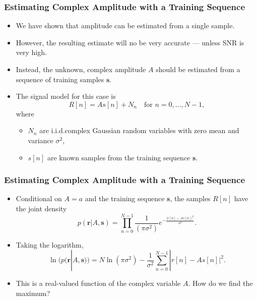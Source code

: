 \begin{frame}
  \frametitle{Estimating Complex Amplitude with a Training Sequence}
  \begin{itemize}
  \item We have shown that amplitude can be estimated from a single
    sample.
  \item However, the resulting estimate will no be very accurate ---
    unless SNR is very high.
  \item Instead, the unknown, complex amplitude $A$ should be estimated from a sequence
    of training samples $\bm{s}$.
  \item The signal model for this case is
    \[
      R[n] = A s[n] + N_n \quad \text{for $n=0, \ldots, N-1$},
    \]
    where
    \begin{itemize}
    \item $N_n$ are i.i.d.\@  complex Gaussian random variables with
      zero mean and variance $\sigma^2$,
    \item $s[n]$ are known samples from the training sequence $\bm{s}$.
    \end{itemize}
  \end{itemize}
\end{frame}

\begin{frame}
  \frametitle{Estimating Complex Amplitude with a Training Sequence}
  \begin{itemize}
  \item Conditional on $A=a$ and the training sequence $\bm{s}$, the
    samples $R[n]$ have the joint density
    \[
      p(\bm{r} |A, \bm{s}) = \prod_{n=0}^{N-1} \frac{1}{(\pi
        \sigma^2)} e^{-\frac{|r[n] - As[n]|^2}{\sigma^2}}.
    \]
  \item Taking the logarithm,
    \[
      \ln( p(\bm{r} |A, \bm{s})) = N \ln(\pi \sigma^2) -
      \frac{1}{\sigma^2} \sum_{n=0}^{N-1} |r[n] - As[n]|^2.
    \]
  \item This is a real-valued function of the complex variable
    $A$. How do we find the maximum?
  \end{itemize}
\end{frame}

